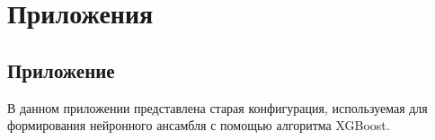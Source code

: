 \renewcommand{\chaptermark}[1]{\markboth{}{}}
\renewcommand{\sectionmark}[1]{\markright{\arabic{section}.\ #1}}

\titleformat{\section}[block]{\large\bfseries\filcenter}{}{0em}{}
\chapter*{Приложения}

\section{Приложение }
\label{subsec:old_polaris_learn_config}

В данном приложении представлена старая конфигурация, используемая для формирования нейронного ансамбля с помощью алгоритма XGBoost.

%


